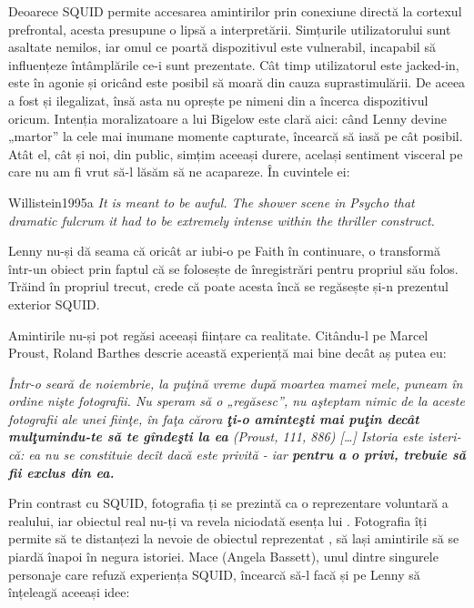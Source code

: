 \documentclass[12pt]{article}
\begin{document}
{Deoarece SQUID permite accesarea amintirilor prin conexiune directă la cortexul prefrontal, acesta presupune o lipsă a interpretării. Simțurile utilizatorului sunt asaltate nemilos, iar omul ce poartă dispozitivul este vulnerabil, incapabil să influențeze întâmplările ce-i sunt prezentate. Cât timp utilizatorul este jacked-in, este în agonie și oricând este posibil să moară din cauza suprastimulării. De aceea a fost și ilegalizat, însă asta nu oprește pe nimeni din a încerca dispozitivul oricum. Intenția moralizatoare a lui Bigelow este clară aici: când Lenny devine „martor” la cele mai inumane momente capturate, încearcă să iasă pe cât posibil. Atât el, cât și noi, din public, simțim aceeași durere, același sentiment visceral pe care nu am fi vrut să-l lăsăm să ne acapareze. În cuvintele ei:\par

\begin{displaycquote}{Willistein1995a}
	\textit{It is meant to be awful. The shower scene in \textit{Psycho} \textemdash that dramatic fulcrum \textemdash it had to be extremely intense within the thriller construct.}
\end{displaycquote}

Lenny nu-și dă seama că oricât ar iubi-o pe Faith în continuare, o transformă într-un obiect prin faptul că se folosește de înregistrări pentru propriul său folos. Trăind în propriul trecut, crede că poate acesta încă se regăsește și-n prezentul exterior SQUID.\par

Amintirile nu-și pot regăsi aceeași ființare ca realitate. Citându-l pe Marcel Proust, Roland Barthes descrie această experiență mai bine decât aș putea eu:

\begin{displayquote}
	\textit{Într-o seară de noiembrie, la puţină vreme după moartea mamei mele, puneam în ordine nişte fotografii. Nu speram să o „regăsesc”, nu aşteptam nimic de la \guillemetleft aceste fotografii ale unei fiinţe, în faţa cărora \textbf{ţi-o aminteşti mai puţin decât mulţumindu-te să te gîndeşti la ea}\guillemetright\: (Proust, 111, 886) […] Istoria este isteri­că: ea nu se constituie decît dacă este privită - iar \textbf{pentru a o privi, trebuie să fii exclus din ea.}}
\end{displayquote}

Prin contrast cu SQUID, fotografia ți se prezintă ca o reprezentare voluntară a realului, iar obiectul real nu-ți va revela niciodată esența lui \cite{BarthesCameraluminoasa2009a}. Fotografia îți permite să te distanțezi la nevoie de obiectul reprezentat \cite{secSontagPlatosCavea}, să lași amintirile să se piardă înapoi în negura istoriei. Mace (Angela Bassett), unul dintre singurele personaje care refuză experiența SQUID, încearcă să-l facă și pe Lenny să înțeleagă aceeași idee:\par

}
\end{document}
